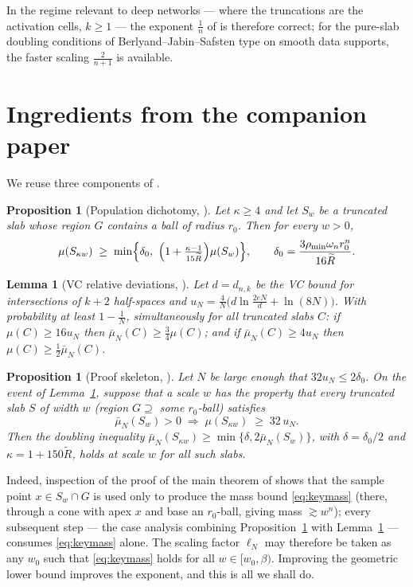 ﻿\documentclass[11pt]{article}
\newtheorem{lemma}[theorem]{Lemma}
\newtheorem{proposition}[theorem]{Proposition}
\newcommand{\emp}{\bar\mu_N}
\begin{document}
In the regime relevant to deep networks --- where the truncations are the
activation cells, $k\ge1$ --- the exponent $\frac1n$ of \cite{companion2} is
therefore correct; for the pure-slab doubling conditions of
Berlyand--Jabin--Safsten type \cite{BJS} on smooth data supports, the faster
scaling $\frac2{n+1}$ is available.

\section{Ingredients from the companion paper}\label{sec:prelim}

We reuse three components of \cite{companion2}.

\begin{proposition}[{Population dichotomy, \cite{companion2}}]
\label{prop:population}
Let $\kappa\ge4$ and let $S_w$ be a truncated slab whose region $G$ contains a
ball of radius $r_0$.  Then for every $w>0$,
\[
\mu(S_{\kappa w})\;\ge\;\min\Bigl\{\delta_0,\
\Bigl(1+\tfrac{\kappa-1}{15\widetilde R}\Bigr)\mu(S_w)\Bigr\},
\qquad
\delta_0=\frac{3\rho_{\min}\omega_nr_0^n}{16\widetilde R}.
\]
\end{proposition}

\begin{lemma}[{VC relative deviations, \cite{companion2}}]
\label{lem:vc}
Let $d=d_{n,k}$ be the VC bound for intersections of $k+2$ half-spaces and
$u_N=\frac4N\bigl(d\ln\frac{2eN}d+\ln(8N)\bigr)$.  With probability at least
$1-\frac1N$, simultaneously for all truncated slabs $C$:
if $\mu(C)\ge16u_N$ then $\emp(C)\ge\frac34\mu(C)$; and if
$\emp(C)\ge4u_N$ then $\mu(C)\ge\frac12\emp(C)$.
\end{lemma}

\begin{proposition}[{Proof skeleton, \cite{companion2}}]\label{prop:skeleton}
Let $N$ be large enough that $32u_N\le2\delta_0$.  On the event of
Lemma~\ref{lem:vc}, suppose that a scale $w$ has the property that every
truncated slab $S$ of width $w$ (region $G\supseteq$ some $r_0$-ball) satisfies
\begin{equation}\label{eq:keymass}
\emp(S_w)>0
\;\Longrightarrow\;
\mu(S_{\kappa w})\;\ge\;32\,u_N .
\end{equation}
Then the doubling inequality
$\emp(S_{\kappa w})\ge\min\{\delta,2\emp(S_w)\}$, with
$\delta=\delta_0/2$ and $\kappa=1+150\widetilde R$, holds at scale $w$ for all
such slabs.
\end{proposition}

Indeed, inspection of the proof of the main theorem of \cite{companion2} shows
that the sample point $x\in S_w\cap G$ is used only to produce the mass bound
\eqref{eq:keymass} (there, through a cone with apex $x$ and base an
$r_0$-ball, giving mass $\gtrsim w^n$); every subsequent step --- the case
analysis combining Proposition~\ref{prop:population} with
Lemma~\ref{lem:vc} --- consumes \eqref{eq:keymass} alone.  The scaling factor
$\ell_N$ may therefore be taken as any $w_0$ such that \eqref{eq:keymass} holds
for all $w\in[w_0,\beta)$.  Improving the geometric lower bound improves the
exponent, and this is all we shall do.
\end{document}
